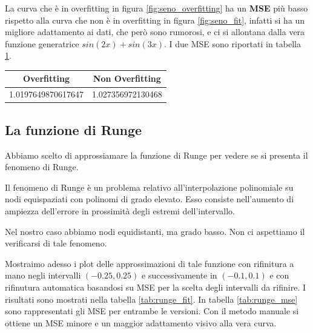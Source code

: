 \documentclass[../main.tex]{subfiles}
\begin{document}
\begin{remark}
    La curva che è in overfitting in figura \ref{fig:seno_overfitting} ha un \textbf{MSE} più basso rispetto alla curva che non è in 
    overfitting in figura \ref{fig:seno_fit}, infatti si ha un migliore adattamento ai dati, che però sono rumorosi, e ci si allontana dalla 
    vera funzione generatrice $sin(2x) + sin(3x)$. I due MSE sono riportati in tabella \ref{tab:MSE}.

    \begin{table}[h!]
        \centering
         \begin{tabular}{||c c ||} 
         \hline
         Overfitting & Non Overfitting \\ [0.5ex] 
         \hline\hline
         1.0197649870617647 & 1.027356972130468 \\  [1ex] 
         \hline
         \end{tabular}
         \label{tab:MSE}
        \end{table}
\end{remark}

\subsection{La funzione di Runge}
Abbiamo scelto di approssiamare la funzione di Runge per vedere se si presenta il fenomeno di Runge.
\begin{definition}
    Il fenomeno di Runge è un problema relativo all'interpolazione polinomiale su nodi equispaziati con polinomi di grado elevato. 
    Esso consiste nell'aumento di ampiezza dell'errore in prossimità degli estremi dell'intervallo.
\end{definition}
Nel nostro caso abbiamo nodi equidistanti, ma grado basso. Non ci aspettiamo il verificarsi di tale fenomeno.

Mostraimo adesso i plot delle approssimazioni di tale funzione con rifinitura a mano negli intervalli $(-0.25,0.25)$ e successivamente 
in $(-0.1,0.1)$ e con rifinutura automatica basandosi su MSE per la scelta degli intervalli da rifinire. I risultati sono mostrati nella 
tabella \ref{tab:runge_fit}.
In tabella \ref{tab:runge_mse} sono rappresentati gli MSE per entrambe le versioni. Con il metodo manuale si ottiene un MSE minore 
e un maggior adattamento visivo alla vera curva.
\end{document}
